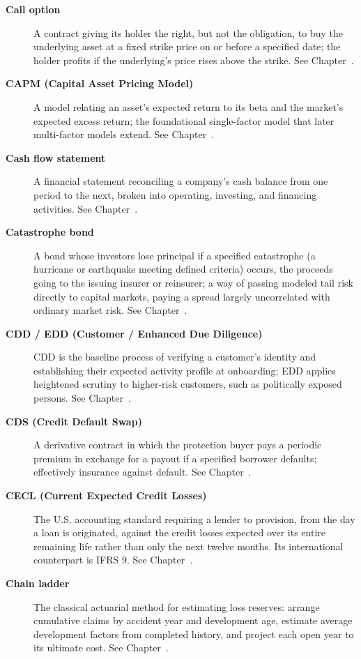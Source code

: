 \documentclass[../ai_in_finance]{subfiles}
\begin{document}
\begin{description}
\item[\textbf{Call option}] A contract giving its holder the right, but not the obligation, to buy the underlying asset at a fixed strike price on or before a specified date; the holder profits if the underlying's price rises above the strike. See Chapter~.

\item[\textbf{CAPM (Capital Asset Pricing Model)}] A model relating an asset's expected return to its beta and the market's expected excess return; the foundational single-factor model that later multi-factor models extend. See Chapter~.

\item[\textbf{Cash flow statement}] A financial statement reconciling a company's cash balance from one period to the next, broken into operating, investing, and financing activities. See Chapter~.

\item[\textbf{Catastrophe bond}] A bond whose investors lose principal if a specified catastrophe (a hurricane or earthquake meeting defined criteria) occurs, the proceeds going to the issuing insurer or reinsurer; a way of passing modeled tail risk directly to capital markets, paying a spread largely uncorrelated with ordinary market risk. See Chapter~.

\item[\textbf{CDD / EDD (Customer / Enhanced Due Diligence)}] CDD is the baseline process of verifying a customer's identity and establishing their expected activity profile at onboarding; EDD applies heightened scrutiny to higher-risk customers, such as politically exposed persons. See Chapter~.

\item[\textbf{CDS (Credit Default Swap)}] A derivative contract in which the protection buyer pays a periodic premium in exchange for a payout if a specified borrower defaults; effectively insurance against default. See Chapter~.

\item[\textbf{CECL (Current Expected Credit Losses)}] The U.S. accounting standard requiring a lender to provision, from the day a loan is originated, against the credit losses expected over its entire remaining life rather than only the next twelve months. Its international counterpart is IFRS 9. See Chapter~.
\item[\textbf{Chain ladder}] The classical actuarial method for estimating loss reserves: arrange cumulative claims by accident year and development age, estimate average development factors from completed history, and project each open year to its ultimate cost. See Chapter~.


\end{description}
\end{document}

